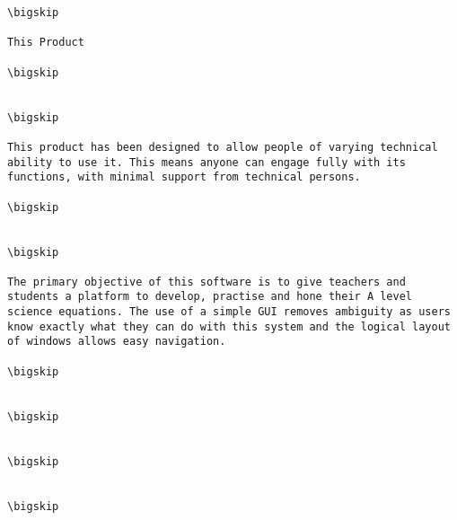 \documentclass{article}
\begin{document}
\begin{verbatim}
\bigskip

This Product

\bigskip


\bigskip

This product has been designed to allow people of varying technical ability to use it. This means anyone can engage fully with its functions, with minimal support from technical persons.

\bigskip


\bigskip

The primary objective of this software is to give teachers and students a platform to develop, practise and hone their A level science equations. The use of a simple GUI removes ambiguity as users know exactly what they can do with this system and the logical layout of windows allows easy navigation.

\bigskip


\bigskip


\bigskip


\bigskip
\end{verbatim}
\end{document}
